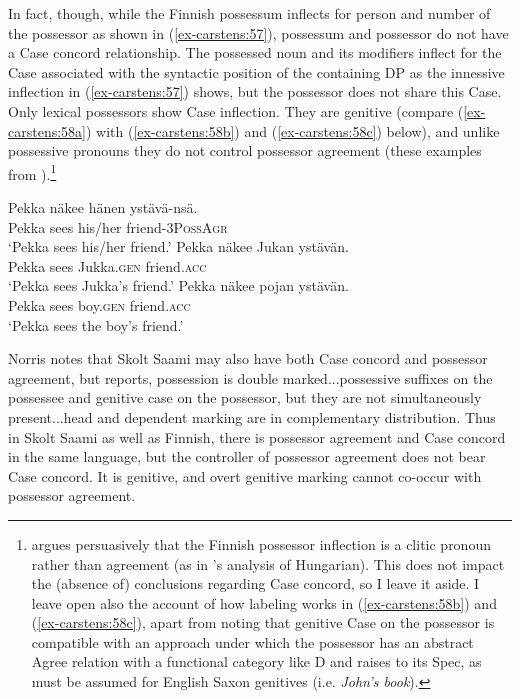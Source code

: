 \documentclass[output=paper
,modfonts
,nonflat]{langsci/langscibook}
\begin{document}
In fact, though, while the Finnish possessum inflects for person and number of the possessor as shown in (\ref{ex-carstens:57}), possessum and possessor do not have a Case concord relationship. The possessed noun and its modifiers inflect for the Case associated with the syntactic position of the containing DP as the innessive inflection in (\ref{ex-carstens:57}) shows, but the possessor does not share this Case. Only lexical possessors show Case inflection. They are genitive (compare (\ref{ex-carstens:58a}) with (\ref{ex-carstens:58b}) and (\ref{ex-carstens:58c}) below), and unlike possessive pronouns they do not control possessor agreement (these examples from \citealt[582-583]{Toivonen2000}).\footnote{\label{note23}\citet{Toivonen2000} argues persuasively that the Finnish possessor inflection is a clitic pronoun rather than agreement (as in \citealt{Den_Dikken2015}'s analysis of Hungarian). This does not impact the (absence of) conclusions regarding Case concord, so I leave it aside. I leave open also the account of how labeling works in (\ref{ex-carstens:58b}) and (\ref{ex-carstens:58c}), apart from noting that genitive Case on the possessor is compatible with an approach under which the possessor has an abstract Agree relation with a functional category like D and raises to its Spec, as must be assumed for English Saxon genitives (i.e. \textit{John's book}).}    

\begin{exe}
	\ex \label{ex-carstens:58} \xlist
	\ex \label{ex-carstens:58a}
	\gll Pekka n\"{a}kee  hänen     yst\"{a}v\"{a}-ns\"{a}.\\
	Pekka sees    his/her   friend-3P\textsc{oss}A\textsc{gr}\\
	\glt `Pekka sees his/her friend.'
	\ex \label{ex-carstens:58b}
	\gll Pekka n\"{a}kee   Jukan        yst\"{a}v\"{a}n.\\
	 Pekka sees       Jukka.\textsc{gen}   friend.\textsc{acc}\\
	\glt `Pekka sees Jukka's friend.'
	\ex \label{ex-carstens:58c}
	\gll Pekka n\"{a}kee   pojan       yst\"{a}v\"{a}n.\\
	Pekka sees     boy.\textsc{gen}     friend.\textsc{acc}\\
	\glt `Pekka sees the boy's friend.'
	\endxlist
\end{exe}
Norris notes that Skolt Saami may also have both Case concord and possessor agreement, but \citet{Miestamo2011} reports, {\textquotedbl}possession is double marked...possessive suffixes on the possessee and genitive case on the possessor, but they are not simultaneously present...head and dependent marking are in complementary distribution.{\textquotedbl} Thus in Skolt Saami as well as Finnish, there is possessor agreement and Case concord in the same language, but the controller of possessor agreement does not bear Case concord. It is genitive, and overt genitive marking cannot co-occur with possessor agreement. 
\end{document}
